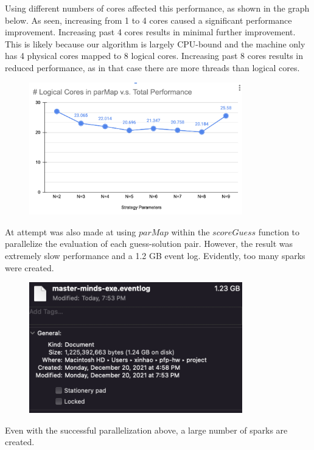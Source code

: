 \documentclass{article}
\begin{document}
Using different numbers of cores affected this performance, as shown in the graph below. As seen, increasing from 1 to 4 cores caused a significant performance improvement. Increasing past 4 cores results in minimal further improvement. This is likely because our algorithm is largely CPU-bound and the machine only has 4 physical cores mapped to 8 logical cores. Increasing past 8 cores results in reduced performance, as in that case there are more threads than logical cores.
\begin{figure}[H]
	\centering
	\includegraphics[width=25em]{../images/pm_line.png}
\end{figure}


At attempt was also made at using $parMap$ within the $scoreGuess$ function to parallelize the evaluation of each guess-solution pair. However, the result was extremely slow performance and a 1.2 GB event log. Evidently, too many sparks were created.
\begin{figure}[H]
	\centering
	\includegraphics[width=25em]{../images/second_pm.png}
\end{figure}

Even with the successful parallelization above, a large number of sparks are created.
\end{document}
